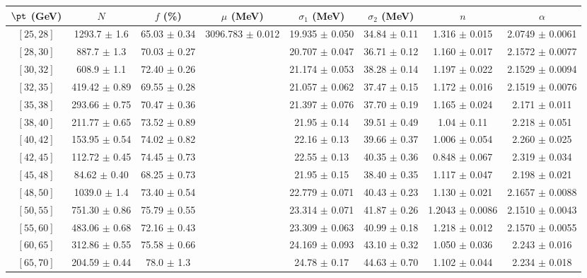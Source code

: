\begin{tabular}{c||c|c|c|c|c|c|c}
$\pt$ (GeV) & $N$ & $f$ (\%) & $\mu$ (MeV) & $\sigma_1$ (MeV) & $\sigma_2$ (MeV) & $n$ & $\alpha$ \\
\hline
$[25, 28]$ & 1293.7 $\pm$ 1.6 & 65.03 $\pm$ 0.34 & \multirow{19}{*}{3096.783 $\pm$ 0.012} & 19.935 $\pm$ 0.050 & 34.84 $\pm$ 0.11 & 1.316 $\pm$ 0.015 & 2.0749 $\pm$ 0.0061\\
$[28, 30]$ & 887.7 $\pm$ 1.3 & 70.03 $\pm$ 0.27 &  & 20.707 $\pm$ 0.047 & 36.71 $\pm$ 0.12 & 1.160 $\pm$ 0.017 & 2.1572 $\pm$ 0.0077\\
$[30, 32]$ & 608.9 $\pm$ 1.1 & 72.40 $\pm$ 0.26 &  & 21.174 $\pm$ 0.053 & 38.28 $\pm$ 0.14 & 1.197 $\pm$ 0.022 & 2.1529 $\pm$ 0.0094\\
$[32, 35]$ & 419.42 $\pm$ 0.89 & 69.55 $\pm$ 0.28 &  & 21.057 $\pm$ 0.062 & 37.47 $\pm$ 0.15 & 1.172 $\pm$ 0.016 & 2.1519 $\pm$ 0.0076\\
$[35, 38]$ & 293.66 $\pm$ 0.75 & 70.47 $\pm$ 0.36 &  & 21.397 $\pm$ 0.076 & 37.70 $\pm$ 0.19 & 1.165 $\pm$ 0.024 & 2.171 $\pm$ 0.011\\
$[38, 40]$ & 211.77 $\pm$ 0.65 & 73.52 $\pm$ 0.89 &  & 21.95 $\pm$ 0.14 & 39.51 $\pm$ 0.49 & 1.04 $\pm$ 0.11 & 2.218 $\pm$ 0.051\\
$[40, 42]$ & 153.95 $\pm$ 0.54 & 74.02 $\pm$ 0.82 &  & 22.16 $\pm$ 0.13 & 39.66 $\pm$ 0.37 & 1.006 $\pm$ 0.054 & 2.260 $\pm$ 0.025\\
$[42, 45]$ & 112.72 $\pm$ 0.45 & 74.45 $\pm$ 0.73 &  & 22.55 $\pm$ 0.13 & 40.35 $\pm$ 0.36 & 0.848 $\pm$ 0.067 & 2.319 $\pm$ 0.034\\
$[45, 48]$ & 84.62 $\pm$ 0.40 & 68.25 $\pm$ 0.73 &  & 21.95 $\pm$ 0.15 & 38.40 $\pm$ 0.35 & 1.117 $\pm$ 0.047 & 2.198 $\pm$ 0.021\\
$[48, 50]$ & 1039.0 $\pm$ 1.4 & 73.40 $\pm$ 0.54 &  & 22.779 $\pm$ 0.071 & 40.43 $\pm$ 0.23 & 1.130 $\pm$ 0.021 & 2.1657 $\pm$ 0.0088\\
$[50, 55]$ & 751.30 $\pm$ 0.86 & 75.79 $\pm$ 0.55 &  & 23.314 $\pm$ 0.071 & 41.87 $\pm$ 0.26 & 1.2043 $\pm$ 0.0086 & 2.1510 $\pm$ 0.0043\\
$[55, 60]$ & 483.06 $\pm$ 0.68 & 72.16 $\pm$ 0.43 &  & 23.309 $\pm$ 0.063 & 40.99 $\pm$ 0.18 & 1.218 $\pm$ 0.012 & 2.1570 $\pm$ 0.0055\\
$[60, 65]$ & 312.86 $\pm$ 0.55 & 75.58 $\pm$ 0.66 &  & 24.169 $\pm$ 0.093 & 43.10 $\pm$ 0.32 & 1.050 $\pm$ 0.036 & 2.243 $\pm$ 0.016\\
$[65, 70]$ & 204.59 $\pm$ 0.44 & 78.0 $\pm$ 1.3 &  & 24.78 $\pm$ 0.17 & 44.63 $\pm$ 0.70 & 1.102 $\pm$ 0.044 & 2.234 $\pm$ 0.018\\

\end{tabular}
